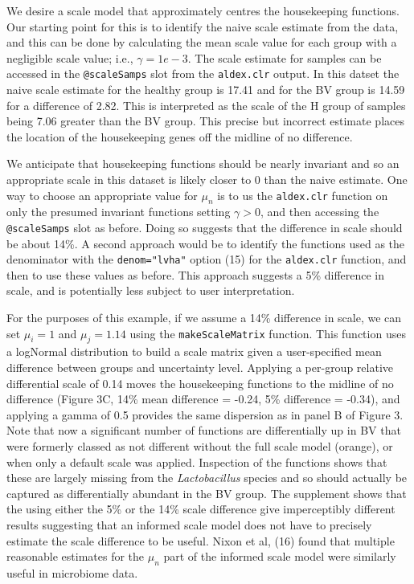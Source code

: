 \documentclass[
]{article}
\begin{document}
We desire a scale model that approximately centres the housekeeping
functions. Our starting point for this is to identify the naive scale
estimate from the data, and this can be done by calculating the mean
scale value for each group with a negligible scale value; i.e.,
\(\gamma=1e-3\). The scale estimate for samples can be accessed in the
\texttt{@scaleSamps} slot from the \texttt{aldex.clr} output. In this
datset the naive scale estimate for the healthy group is 17.41 and for
the BV group is 14.59 for a difference of 2.82. This is interpreted as
the scale of the H group of samples being 7.06 greater than the BV
group. This precise but incorrect estimate places the location of the
housekeeping genes off the midline of no difference.

We anticipate that housekeeping functions should be nearly invariant and
so an appropriate scale in this dataset is likely closer to 0 than the
naive estimate. One way to choose an appropriate value for \(\mu_n\) is
to us the \texttt{aldex.clr} function on only the presumed invariant
functions setting \(\gamma > 0\), and then accessing the
\texttt{@scaleSamps} slot as before. Doing so suggests that the
difference in scale should be about 14\%. A second approach would be to
identify the functions used as the denominator with the
\texttt{denom="lvha"} option (15) for the \texttt{aldex.clr} function,
and then to use these values as before. This approach suggests a 5\%
difference in scale, and is potentially less subject to user
interpretation.

For the purposes of this example, if we assume a 14\% difference in
scale, we can set \(\mu_i = 1\) and \(\mu_j = 1.14\) using the
\texttt{makeScaleMatrix} function. This function uses a logNormal
distribution to build a scale matrix given a user-specified mean
difference between groups and uncertainty level. Applying a per-group
relative differential scale of 0.14 moves the housekeeping functions to
the midline of no difference (Figure 3C, 14\% mean difference = -0.24,
5\% difference = -0.34), and applying a gamma of 0.5 provides the same
dispersion as in panel B of Figure 3. Note that now a significant number
of functions are differentially up in BV that were formerly classed as
not different without the full scale model (orange), or when only a
default scale was applied. Inspection of the functions shows that these
are largely missing from the \emph{Lactobacillus} species and so should
actually be captured as differentially abundant in the BV group. The
supplement shows that the using either the 5\% or the 14\% scale
difference give imperceptibly different results suggesting that an
informed scale model does not have to precisely estimate the scale
difference to be useful. Nixon et al, (16) found that multiple
reasonable estimates for the \(\mu_n\) part of the informed scale model
were similarly useful in microbiome data.
\end{document}
